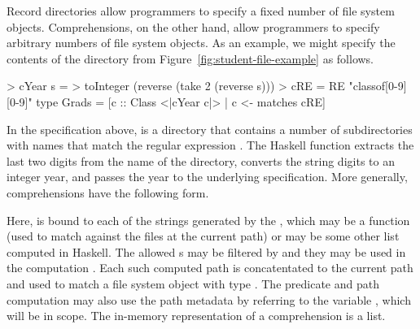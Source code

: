 Record directories allow programmers to specify a fixed number of file system objects.
Comprehensions, on the other hand, allow programmers to specify arbitrary numbers
of file system objects.  As an example, we might specify the contents of the
 directory from Figure~\ref{fig:student-file-example} as follows.
\begin{code}
> cYear s = 
>   toInteger (reverse (take 2 (reverse s)))
> cRE = RE "classof[0-9][0-9]"
\mbox{}
type Grads = 
  [c :: Class <|cYear c|> | c <- matches cRE]
\end{code}
In the specification above,  is a directory that contains a number of
 subdirectories with names  that match the regular expression
.  The Haskell function  extracts the last two digits from the
name of the directory, converts the string digits to an integer year, and passes
the year to the underlying  specification.
More generally, comprehensions have the following form.
\begin{code}
\end{code}
Here,  is bound to each of the strings generated by the ,
which may be a  function (used to match against the files
at the current path) or may be some other list computed in Haskell. The allowed
s may be filtered by  and they may be used in the computation
.  Each such computed path is concatentated to the current path and
used to match a file system object with type .  The predicate and path
computation may also use the path metadata by referring to the variable
, which will be in scope.  The in-memory representation of a comprehension
is a list.

